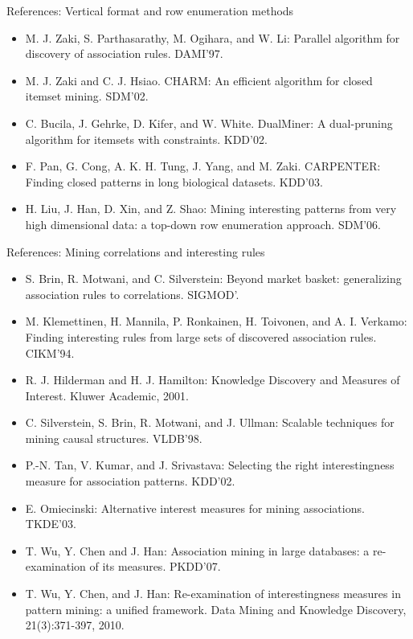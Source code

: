 \documentclass[aspectratio=169,t]{beamer}
\begin{document}
  {
    \begin{frame}{References: Vertical format and row enumeration methods}
    \begin{itemize}
      \item M. J. Zaki, S. Parthasarathy, M. Ogihara, and W. Li: Parallel algorithm for discovery of association rules. DAMI'97.
      \item M. J. Zaki and C. J. Hsiao. CHARM: An efficient algorithm for closed itemset mining. SDM'02.
      \item C. Bucila, J. Gehrke, D. Kifer, and W. White. DualMiner: A dual-pruning algorithm for itemsets with constraints. KDD'02.
      \item F. Pan, G. Cong, A. K. H. Tung, J. Yang, and M. Zaki. CARPENTER: Finding closed patterns in long biological datasets. KDD'03.
      \item H. Liu, J. Han, D. Xin, and Z. Shao: Mining interesting patterns from very high dimensional data: a top-down row enumeration approach. SDM'06.
    \end{itemize}
    \end{frame}
  }

  {
    \begin{frame}{References: Mining correlations and interesting rules}
    \begin{itemize}
      \item S. Brin, R. Motwani, and C. Silverstein: Beyond market basket: generalizing association rules to correlations. SIGMOD'.
      \item M. Klemettinen, H. Mannila, P. Ronkainen, H. Toivonen, and A. I. Verkamo: Finding interesting rules from large sets of discovered association rules.  CIKM'94.
      \item R. J. Hilderman and H. J. Hamilton: Knowledge Discovery and Measures of Interest. Kluwer Academic, 2001.
      \item C. Silverstein, S. Brin, R. Motwani, and J. Ullman: Scalable techniques for mining causal structures. VLDB'98.
      \item P.-N. Tan, V. Kumar, and J. Srivastava: Selecting the right interestingness measure for association patterns. KDD'02.
      \item E. Omiecinski: Alternative interest measures for mining associations. TKDE'03.
      \item T. Wu, Y. Chen and J. Han: Association mining in large databases: a re-examination of its measures. PKDD'07.
      \item T. Wu, Y. Chen, and J. Han: Re-examination of interestingness measures in pattern mining: a unified framework. Data Mining and Knowledge Discovery, 21(3):371-397, 2010.
    \end{itemize}
    \end{frame}
  }
\end{document}
